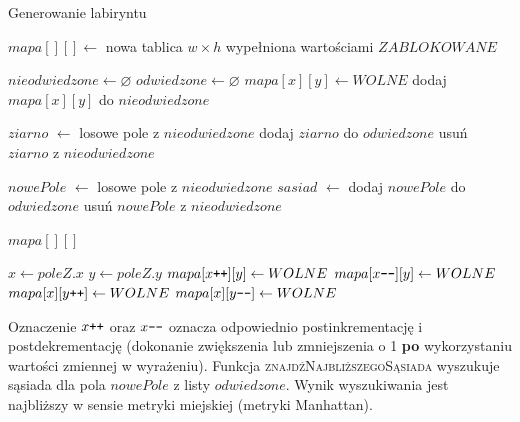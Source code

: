 \begin{algorithm}[H]
	\caption{Generowanie labiryntu}\label{alg:mazegen}
  \begin{algorithmic}[1]

\State $mapa[][] \gets$ nowa tablica $w \times h$ wypełniona wartościami $ZABLOKOWANE$

\State $nieodwiedzone \gets \varnothing$ 
\State $odwiedzone \gets \varnothing$
 
	 
		\State $mapa[x][y] \gets WOLNE$
		\State dodaj $mapa[x][y]$ do $nieodwiedzone$
	\EndFor
\EndFor

\State $ziarno$ $\gets$ losowe pole z $nieodwiedzone$
\State dodaj $ziarno$ do $odwiedzone$
\State usuń $ziarno$ z $nieodwiedzone$

 
	\State $nowePole$ $\gets$ losowe pole z $nieodwiedzone$
	\State $sasiad$ $\gets$ 
	\State {}
	\State dodaj $nowePole$ do $odwiedzone$
	\State usuń $nowePole$ z $nieodwiedzone$
\EndWhile

 $mapa[][]$

\State 
{}
	\State $x \gets poleZ.x$
	\State $y \gets poleZ.y$
	 
		\State $mapa[x\verb-++-][y] \gets WOLNE$ 
	\EndWhile
	 
		\State $mapa[x\verb+--+][y] \gets WOLNE$
	\EndWhile
	 
		\State $mapa[x][y\verb-++-] \gets WOLNE$
	\EndWhile
	 
		\State $mapa[x][y\verb+--+] \gets WOLNE$
	\EndWhile
\EndFunction
  \end{algorithmic}
\end{algorithm}

Oznaczenie $x\verb-++-$ oraz $x\verb+--+$ oznacza odpowiednio postinkrementację i postdekrementację (dokonanie zwiększenia lub zmniejszenia o 1 {\bf po} wykorzystaniu wartości zmiennej w wyrażeniu).
Funkcja \textsc{znajdźNajbliższegoSąsiada} wyszukuje sąsiada dla pola $nowePole$ z listy $odwiedzone$. Wynik wyszukiwania jest najbliższy w sensie metryki miejskiej (metryki Manhattan).

